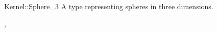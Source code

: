 \begin{ccRefConcept}{Kernel::Sphere_3}
A type representing spheres in three dimensions.

\ccRefines
{},

\ccSeeAlso
{}
\end{ccRefConcept}

